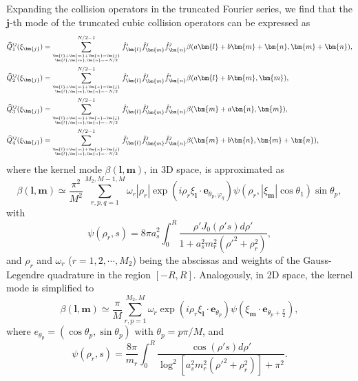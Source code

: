 Expanding the collision operators in the truncated Fourier series, we find that the $\bm{j}$-th mode of the truncated cubic collision operators can be expressed as
\begin{equation}
\begin{aligned}[b]
\widehat{Q}_1^{\imath\jmath}(\xi_{\bm{j}})=& 		 \sum_{\bm{l}+\bm{m}+\bm{n}=\bm{j} \atop   \bm{l},\bm{m},\bm{n}=-N/2}^{{N}/2-1}
\hat{f}^\imath_{\bm{l}}\hat{f}^\jmath_{\bm{m}}\hat{f}^\jmath_{\bm{n}}
\beta(a\bm{l}+b\bm{m}+\bm{n},\bm{m}+\bm{n}), \\
\widehat{Q}_2^{\imath\jmath}(\xi_{\bm{j}})=& \sum_{\bm{l}+\bm{m}+\bm{n}=\bm{j} \atop   \bm{l},\bm{m},\bm{n}=-N/2}^{{N}/2-1}\hat{f}^\imath_{\bm{l}}\hat{f}^\jmath_{\bm{m}}\hat{f}^\imath_{\bm{n}}
\beta(a\bm{l}+b\bm{m},\bm{m}), \\
\widehat{Q}_3^{\imath\jmath}(\xi_{\bm{j}})=& \sum_{\bm{l}+\bm{m}+\bm{n}=\bm{j} \atop   \bm{l},\bm{m},\bm{n}=-N/2}^{{N}/2-1}\hat{f}^\imath_{\bm{l}}\hat{f}^\jmath_{\bm{m}}\hat{f}^\imath_{\bm{n}}
\beta(\bm{m}+a\bm{n},\bm{m}), \\
\widehat{Q}_4^{\imath\jmath}(\xi_{\bm{j}})=& \sum_{\bm{l}+\bm{m}+\bm{n}=\bm{j} \atop
	\bm{l},\bm{m},\bm{n}=-N/2}^{{N}/2-1}\hat{f}^\imath_{\bm{l}}\hat{f}^\jmath_{\bm{m}}\hat{f}^\jmath_{\bm{n}}
\beta(\bm{m}+b\bm{n},\bm{m}+\bm{n}),
\end{aligned}
\end{equation}
where the kernel mode $\beta(\bm{l},\bm{m})$, in 3D space,  is approximated as
\begin{equation}
\beta(\bm{l},\bm{m})
\simeq\frac{\pi^2}{M^2}\sum_{r,p,q=1}^{M_2,M-1,M}\omega_r|\rho_r|
\exp(i\rho_r\xi_{\bm{l}}\cdot{\bm{e}_{\theta_p,\varphi_q}})
\psi(\rho_r,|\xi_{\bm{m}}|\cos\theta_1)\sin\theta_p,
\end{equation}
with
\begin{equation}
\psi(\rho_r,s)=8\pi{}a^2_s\int_{0}^R\frac{\rho'J_0(\rho's)d\rho'}{1+a^2_sm^2_r(\rho'^2+\rho_r^2)},
\end{equation}
and $\rho_r$ and $\omega_r$ ($r=1,2,\cdots,M_2$) being the abscissas and weights of the Gauss-Legendre quadrature in the region $[-R,R]$. Analogously, in 2D space, the kernel mode is simplified to
\begin{equation}\label{tdkernel}
\beta(\bm{l},\bm{m})\simeq\frac{\pi}{M}\sum_{r,p=1}^{M_2,M}\omega_r \exp(i\rho_r\xi_{\bm{l}}\cdot{\bm{e}_{\theta_p}})
\psi(\xi_{\bm{m}}\cdot{\bm{e}_{\theta_p+\frac{\pi}{2}}}),
\end{equation}
where $e_{\theta_p}=(\cos\theta_p,\sin\theta_p)$ with
$\theta_p=p\pi/M$, and
\begin{equation}
\psi(\rho_r,s)=\frac{8\pi}{m_r}\int_{0}^R\frac{\cos(\rho's)d\rho'}{\log^2[a^2_sm^2_r(\rho'^2+\rho_r^2)]+\pi^2}.
\end{equation}


